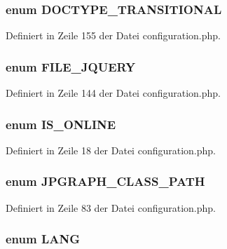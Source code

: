 \subsubsection{\setlength{\rightskip}{0pt plus 5cm}enum {\bf DOCTYPE\_\-TRANSITIONAL}}\label{configuration_8php_d9901a74f7172e024a04c4f7a311c30e}




Definiert in Zeile 155 der Datei configuration.php.
\subsubsection{\setlength{\rightskip}{0pt plus 5cm}enum {\bf FILE\_\-JQUERY}}\label{configuration_8php_408a155a037ef97ed25c46bb2c69530c}




Definiert in Zeile 144 der Datei configuration.php.
\subsubsection{\setlength{\rightskip}{0pt plus 5cm}enum {\bf IS\_\-ONLINE}}\label{configuration_8php_413df8c87e7cdc18782b5af277b8e6d7}




Definiert in Zeile 18 der Datei configuration.php.
\subsubsection{\setlength{\rightskip}{0pt plus 5cm}enum {\bf JPGRAPH\_\-CLASS\_\-PATH}}\label{configuration_8php_de97132687b3e969680882815d4ecbd2}




Definiert in Zeile 83 der Datei configuration.php.
\subsubsection{\setlength{\rightskip}{0pt plus 5cm}enum {\bf LANG}}\label{configuration_8php_04cd7d0c96284e40f226651cf74a2aa8}




